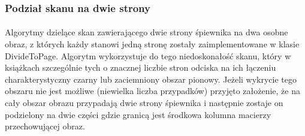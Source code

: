 \documentclass[a4paper,12pt]{article}
\begin{document}
		\subsubsection{Podział skanu na dwie strony}
		    \paragraph{\indent} Algorytmy dzielące skan zawierającego dwie strony śpiewnika na dwa osobne obraz, z których każdy stanowi jedną stronę
		    zostały zaimplementowane w klasie DivideToPage. Algorytm wykorzystuje do tego niedoskonałość          skanu, który w książkach szczególnie tych o znacznej liczbie stron          odciska na ich łączeniu charakterystyczny czarny lub zaciemniony          obszar pionowy. Jeżeli wykrycie tego obszaru nie jest możliwe (niewielka    liczba przypadków) przyjęto założenie, że na cały obszar obrazu przypadają dwie strony śpiewnika i następnie zostaje on podzielony na dwie części gdzie granicą jest środkowa kolumna macierzy przechowującej obraz.    
		    
\end{document}
